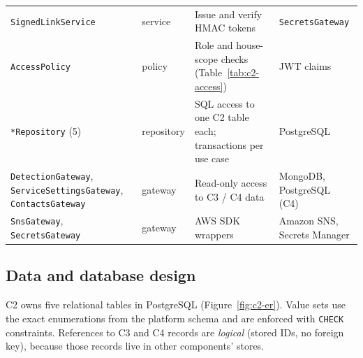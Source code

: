 \begin{longtable}{L{3.6cm}L{1.9cm}L{5.6cm}L{3.7cm}}
\texttt{SignedLinkService} & service & Issue and verify HMAC tokens & \texttt{SecretsGateway} \\
\texttt{AccessPolicy} & policy & Role and house-scope checks (Table~\ref{tab:c2-access}) & JWT claims \\
\texttt{*Repository} (5) & repository & SQL access to one C2 table each; transactions per use case & PostgreSQL \\
\texttt{DetectionGateway}, \texttt{ServiceSettings\allowbreak Gateway}, \texttt{ContactsGateway} & gateway & Read-only access to C3 / C4 data & MongoDB, PostgreSQL (C4) \\
\texttt{SnsGateway}, \texttt{SecretsGateway} & gateway & AWS SDK wrappers & Amazon SNS, Secrets Manager \\
\bottomrule
\end{longtable}

\subsection{Data and database design}
C2 owns five relational tables in PostgreSQL (Figure~\ref{fig:c2-er}). Value sets use the exact enumerations
from the platform schema and are enforced with \texttt{CHECK} constraints. References to C3 and C4 records are
\emph{logical} (stored IDs, no foreign key), because those records live in other components' stores.


